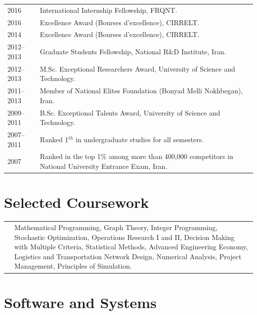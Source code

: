 \documentclass[10PT,letter]{article}
\newcommand{\numbox}[1]{} %
\begin{document}
		\begin{tabular}{p{1.2in}p{5.95in}}
			\textsc{2016} & International Internship Fellowship, FRQNT. \\[1mm]
			\textsc{2016} & Excellence Award (Bourses d'excellence), CIRRELT. \\[1mm] 
			\textsc{2014} & Excellence Award (Bourses d'excellence), CIRRELT. \\[1mm] 
			\textsc{2012--2013} & Graduate Students Fellowship, National R\&D Institute,  Iran.\\[1mm]
			\textsc{2012--2013} & M.Sc. Exceptional Researchers Award, University of Science and Technology.\\[1mm]
			\textsc{2011--2013} & Member of  National Elites Foundation (Bonyad Melli Nokhbegan), Iran.\\[1mm]
			\textsc{2009--2011} & B.Sc. Exceptional Talents Award,  University of Science and Technology.\\[1mm]
			\textsc{2007--2011} & Ranked 1$^{th}$ in undergraduate studies for all semesters.\\[1mm]
				\textsc{2007} & Ranked in the top 1\% among more than 400,000 competitors in National University Entrance Exam, Iran.\\[1mm]
		\end{tabular}




    \section*{\numbox{7}\bfseries\textcolor{titlecol}{\sffamily Selected Coursework}}
			\begin{tabular}{p{0.1in}p{6.55in}}
				
				\textsc{} & 
									Mathematical Programming,   Graph Theory,  Integer Programming,  Stochastic Optimization, Operations Research I and II, Decision Making with Multiple Criteria,  Statistical Methods,  Advanced Engineering Economy,  Logistics and Transportation Network Design, Numerical Analysis, Project Management, Principles of Simulation.\\[1mm]

			\end{tabular}




\section*{\numbox{9}\bfseries\textcolor{titlecol}{\sffamily Software and Systems}}
\end{document}
